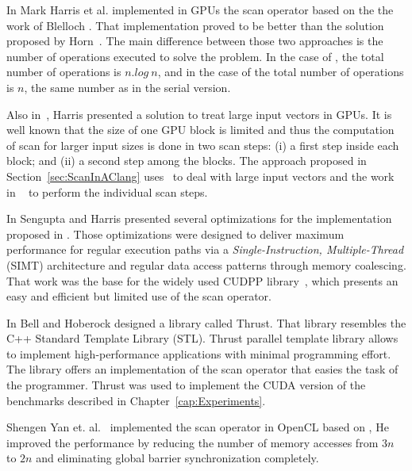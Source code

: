 \documentclass[Ingles]{ic-tese-v1}
\newcommand{\rcap}[1]{Chapter~\ref{cap:#1}}
\newcommand{\rsec}[1]{Section~\ref{sec:#1}}
\begin{document}
In \cite{harris2007parallel} Mark Harris  et al.  implemented in GPUs the scan
operator     based     on     the     the     work     of     Blelloch
\cite{ScanAsPrimitive}. That  implementation proved to be  better than
the solution  proposed by  Horn~\cite{GPUGems2}.  The  main difference
between those two  approaches is the number of  operations executed to
solve the problem. In the case of \cite{GPUGems2}, the total number of
operations is $n.log\ n$, and in the case of \cite{harris2007parallel}
the  total number  of operations  is $n$,  the same  number as  in the
serial version.

Also  in~\cite{harris2007parallel},  Harris  presented a  solution  to
treat large input vectors in GPUs.  It  is well known that the size of
one GPU block  is limited and thus the computation  of scan for larger
input sizes is  done in two scan  steps: (i) a first  step inside each
block; and (ii) a second step among the blocks.  The approach proposed
in  \rsec{ScanInAClang}  uses~\cite{harris2007parallel} to  deal  with
large input vectors and the work in ~\cite{ScanAsPrimitive} to perform
the individual scan steps.

In   \cite{Sengupta:2008}  Sengupta   and  Harris   presented  several
optimizations     for      the     implementation      proposed     in
\cite{harris2007parallel}.   Those  optimizations   were  designed  to
deliver  maximum  performance  for   regular  execution  paths  via  a
\textit{Single-Instruction,  Multiple-Thread} (SIMT)  architecture and
regular data access patterns through memory coalescing.  That work was
the  base  for  the  widely  used  CUDPP  library~\cite{CUDPP},  which
presents an easy and efficient but limited use of the scan operator.

In  \cite{Nathan:2011} Bell  and  Hoberock designed  a library  called
Thrust.   That library  resembles  the C++  Standard Template  Library
(STL).   Thrust  parallel   template  library   allows  to   implement
high-performance  applications with  minimal  programming effort.  The
library offers an implementation of the scan operator that easies the task of
the programmer.  Thrust  was used  to implement  the CUDA version of the
benchmarks described in \rcap{Experiments}.

Shengen Yan et.  al.~\cite{Yan:2013}  implemented the scan operator in
OpenCL based on \cite{harris2007parallel},  He improved the performance
by  reducing the  number  of memory  accesses from  $3n$  to $2n$  and
eliminating global barrier synchronization completely.
\end{document}
